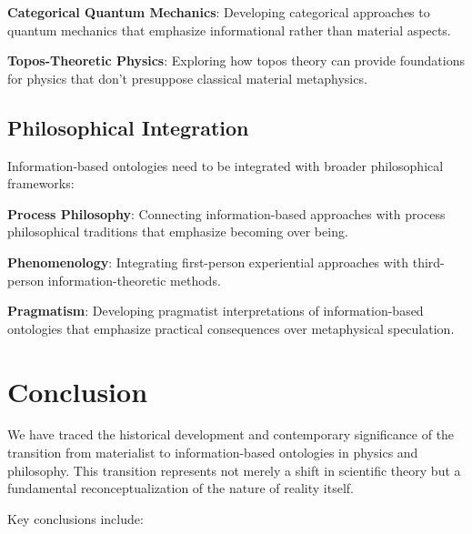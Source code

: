 \documentclass[12pt]{article}
\begin{document}
\textbf{Categorical Quantum Mechanics}: Developing categorical approaches to quantum mechanics that emphasize informational rather than material aspects.

\textbf{Topos-Theoretic Physics}: Exploring how topos theory can provide foundations for physics that don't presuppose classical material metaphysics.

\subsection{Philosophical Integration}

Information-based ontologies need to be integrated with broader philosophical frameworks:

\textbf{Process Philosophy}: Connecting information-based approaches with process philosophical traditions that emphasize becoming over being.

\textbf{Phenomenology}: Integrating first-person experiential approaches with third-person information-theoretic methods.

\textbf{Pragmatism}: Developing pragmatist interpretations of information-based ontologies that emphasize practical consequences over metaphysical speculation.

\section{Conclusion}

We have traced the historical development and contemporary significance of the transition from materialist to information-based ontologies in physics and philosophy. This transition represents not merely a shift in scientific theory but a fundamental reconceptualization of the nature of reality itself.

Key conclusions include:
\end{document}
